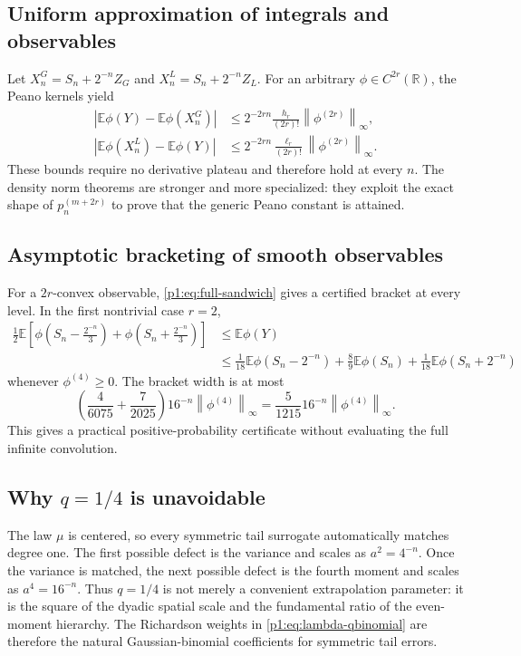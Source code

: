 \documentclass[11pt]{article}
\numberwithin{equation}{section}
\theoremstyle{definition}
\theoremstyle{remark}
\newcommand{\R}{\mathbb R}
\newcommand{\E}{\mathbb E}
\newcommand{\abs}[1]{\left|#1\right|}
\newcommand{\norm}[1]{\left\lVert#1\right\rVert}
\begin{document}
\subsection{Uniform approximation of integrals and observables}

Let $X_n^G=S_n+2^{-n}Z_G$ and $X_n^L=S_n+2^{-n}Z_L$.  For an arbitrary $\phi\in C^{2r}(\R)$, the Peano kernels yield
\begin{align}
 \abs{\E\phi(Y)-\E\phi(X_n^G)}
 &\le 2^{-2rn}\frac{h_r}{(2r)!}\norm{\phi^{(2r)}}_\infty,
 \label{p1:eq:weak-G-full}\\
 \abs{\E\phi(X_n^L)-\E\phi(Y)}
 &\le 2^{-2rn}\frac{\ell_r}{(2r)!}\norm{\phi^{(2r)}}_\infty.
 \label{p1:eq:weak-L-full}
\end{align}
These bounds require no derivative plateau and therefore hold at every $n$.  The density norm theorems are stronger and more specialized: they exploit the exact shape of $p_n^{(m+2r)}$ to prove that the generic Peano constant is attained.

\subsection{Asymptotic bracketing of smooth observables}

For a $2r$-convex observable, \eqref{p1:eq:full-sandwich} gives a certified bracket at every level.  In the first nontrivial case $r=2$,
\begin{align}
 \frac12\E\left[
 \phi\!\left(S_n-\frac{2^{-n}}3\right)
 +\phi\!\left(S_n+\frac{2^{-n}}3\right)
 \right]
 &\le \E\phi(Y)\nonumber\\
 &\le
 \frac1{18}\E\phi(S_n-2^{-n})
 +\frac89\E\phi(S_n)
 +\frac1{18}\E\phi(S_n+2^{-n})
 \label{p1:eq:r2-observable-bracket}
\end{align}
whenever $\phi^{(4)}\ge0$.  The bracket width is at most
\begin{equation}
 \left(\frac4{6075}+\frac7{2025}\right)16^{-n}
 \norm{\phi^{(4)}}_\infty
 =\frac5{1215}16^{-n}\norm{\phi^{(4)}}_\infty.
 \label{p1:eq:r2-bracket-width}
\end{equation}
This gives a practical positive-probability certificate without evaluating the full infinite convolution.

\subsection{Why $q=1/4$ is unavoidable}

The law $\mu$ is centered, so every symmetric tail surrogate automatically matches degree one.  The first possible defect is the variance and scales as $a^2=4^{-n}$.  Once the variance is matched, the next possible defect is the fourth moment and scales as $a^4=16^{-n}$.  Thus $q=1/4$ is not merely a convenient extrapolation parameter: it is the square of the dyadic spatial scale and the fundamental ratio of the even-moment hierarchy.  The Richardson weights in \eqref{p1:eq:lambda-qbinomial} are therefore the natural Gaussian-binomial coefficients for symmetric tail errors.
\end{document}
